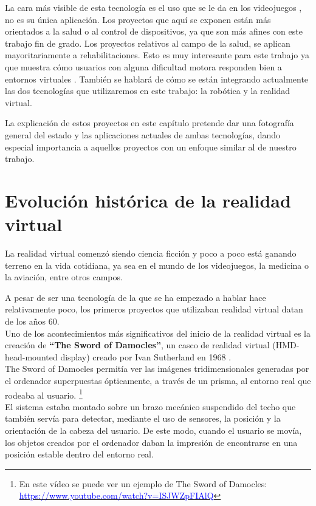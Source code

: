 \documentclass[twoside, 11pt]{epstfg}
\begin{document}
La cara más visible de esta tecnología es el uso que se le da en los videojuegos \cite{vrandvg}, no es su única aplicación. Los proyectos que aquí se exponen están más orientados a la salud o al control de dispositivos, ya que son más afines con este trabajo fin de grado.
Los proyectos relativos al campo de la salud, se aplican mayoritariamente a rehabilitaciones. Esto es muy interesante para este trabajo ya que muestra cómo usuarios con alguna dificultad motora responden bien a entornos virtuales \cite{leeb2012tetraplegic}.
También se hablará de cómo se están integrando actualmente  las dos tecnologías que utilizaremos en este trabajo: la robótica y la realidad virtual.

La explicación de estos proyectos en este capítulo pretende dar una fotografía general del estado y las aplicaciones actuales de ambas tecnologías, dando especial importancia a aquellos proyectos con un enfoque similar al de nuestro trabajo.

\section{Evolución histórica de la realidad virtual}
La realidad virtual comenzó siendo ciencia ficción y poco a poco está ganando terreno en la vida cotidiana, ya sea en el mundo de los videojuegos, la medicina o la aviación, entre otros campos.

A pesar de ser una tecnología de la que se ha empezado a hablar hace relativamente poco, los primeros proyectos que utilizaban realidad virtual datan de los años 60.\\
Uno de los  acontecimientos más significativos del inicio de la realidad virtual es la creación de \textbf{“The Sword of Damocles”}, un casco de realidad virtual (HMD- head-mounted display)  creado por Ivan Sutherland en 1968 \cite{Sutherland}.\\
The Sword of Damocles permitía ver las imágenes tridimensionales generadas por el
ordenador superpuestas ópticamente, a través de un prisma, al entorno real que rodeaba al usuario. \footnote {En este vídeo se  puede ver un ejemplo de The Sword of Damocles: \href{https://www.youtube.com/watch?v=ISJWZpFIAlQ}{\textcolor{blue}{https://www.youtube.com/watch?v=ISJWZpFIAlQ}}}\\
 El sistema estaba montado sobre un brazo mecánico suspendido del techo que también servía para detectar, mediante el uso de sensores, la posición y la orientación de la cabeza del usuario. De este modo, cuando el usuario se movía, los objetos creados por el ordenador daban la impresión de encontrarse en una posición estable dentro del entorno real.
\end{document}
